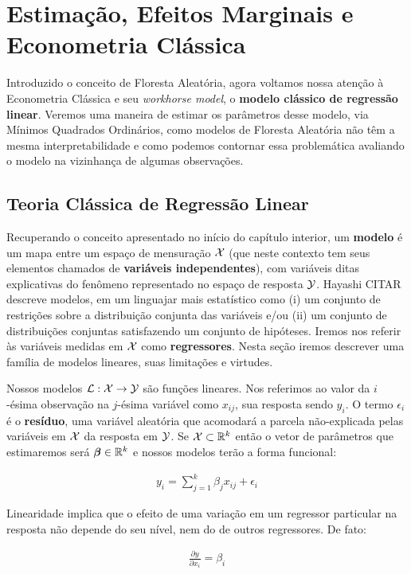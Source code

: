 
\chapter{Estimação, Efeitos Marginais e Econometria Clássica}

Introduzido o conceito de Floresta Aleatória, agora voltamos nossa atenção à Econometria Clássica e seu \textit{workhorse model}, o \textbf{modelo clássico de regressão linear}. Veremos uma maneira de estimar os parâmetros desse modelo, via Mínimos Quadrados Ordinários, como modelos de Floresta Aleatória não têm a mesma interpretabilidade e como podemos contornar essa problemática avaliando o modelo na vizinhança de algumas observações. 



\section{Teoria Clássica de Regressão Linear}

Recuperando o conceito apresentado no início do capítulo interior, um \textbf{modelo} é um mapa entre um espaço de mensuração $\mathcal{X}$ (que neste contexto tem seus elementos chamados de \textbf{variáveis independentes}), com variáveis ditas explicativas do fenômeno representado no espaço de resposta $\mathcal{Y}$. Hayashi CITAR descreve modelos, em um linguajar mais estatístico como (i) um conjunto de restrições sobre a distribuição conjunta das variáveis e/ou (ii) um conjunto de distribuições conjuntas satisfazendo um conjunto de hipóteses. Iremos nos referir às variáveis medidas em $\mathcal{X}$ como \textbf{regressores}. Nesta seção iremos descrever uma família de modelos lineares, suas limitações e virtudes.



\begin{hipotese}[Linearidade]
Nossos modelos $\mathcal{L} : \mathcal{X} \to \mathcal{Y}$ são funções lineares. Nos referimos ao valor da $i$-ésima observação na $j$-ésima variável como $x_{ij}$, sua resposta sendo $y_i$. O termo $\epsilon_i$ é o \textbf{resíduo}, uma variável aleatória que acomodará a parcela não-explicada pelas variáveis em $\mathcal{X}$ da resposta em $\mathcal{Y}$. Se $\mathcal{X} \subset \mathbb{R}^k$ então o vetor de parâmetros que estimaremos será $\boldsymbol{\beta} \in \mathbb{R}^k$ e nossos modelos terão a forma funcional:

\begin{align}
    y_i = \sum_{j = 1}^k \beta_j x_{ij} + \epsilon_i \label{mod_lin}
\end{align}

Linearidade implica que o efeito de uma variação em um regressor particular na resposta não depende do seu nível, nem do de outros regressores. De fato:

\begin{align}
    \frac{\partial y}{\partial x_i} = \beta_i
\end{align}
\end{hipotese}


